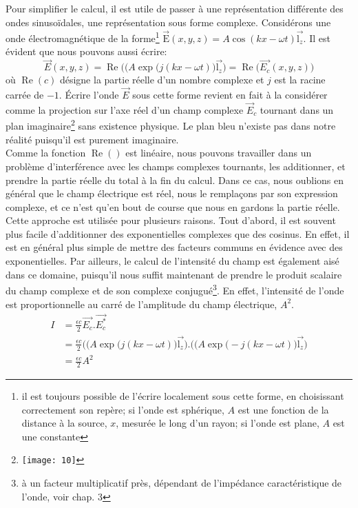Pour simplifier le calcul, il est utile de passer à une représentation différente des ondes sinusoïdales, une représentation sous forme complexe. Considérons une onde électromagnétique de la forme\footnote{il est toujours possible de l'écrire localement sous cette forme, en choisissant correctement son repère; si l'onde est sphérique, $A$ est une fonction de la distance à la source, $x$, mesurée le long d'un rayon; si l'onde est plane, $A$ est une constante} $\overset\rightarrow{\mbox{E}}(x,y,z)=A\cos(kx-\omega t)\overset\rightarrow{\mbox{l}_z}$. Il est évident que nous pouvons aussi écrire:
$$\overset\rightarrow{E}(x,y,z)=\operatorname{Re}\Big((A\exp\big(j(kx-\omega t)\big)\overset\rightarrow{\mbox{l}_z}\Big)=\operatorname{Re}\Big(\overset\rightarrow{E_c}(x,y,z)\Big)$$
où $\operatorname{Re}(c)$ désigne la partie réelle d'un nombre complexe et $j$ est la racine carrée de $-1$. Écrire l'onde $\overset\rightarrow{E}$ sous cette forme revient en fait à la considérer comme la projection sur l'axe réel d'un champ complexe $\overset\rightarrow{E}_c$ tournant dans un plan imaginaire\footnote{\texttt{[image: 10]}} sans existence physique. Le plan bleu n'existe pas dans notre réalité puisqu'il est purement imaginaire.\\

Comme la fonction $\operatorname{Re}()$ est linéaire, nous pouvons travailler dans un problème d'interférence avec les champs complexes tournants, les additionner, et prendre la partie réelle du total à la fin du calcul. Dans ce cas, nous oublions en général que le champ électrique est réel, nous le remplaçons par son expression complexe, et ce n'est qu'en bout de course que nous en gardons la partie réelle.\\

Cette approche est utilisée pour plusieurs raisons. Tout d'abord, il est souvent plus facile d'additionner des exponentielles complexes que des cosinus. En effet, il est en général plus simple de mettre des facteurs communs en évidence avec des exponentielles. Par ailleurs, le calcul de l'intensité du champ est également aisé dans ce domaine, puisqu'il nous suffit maintenant de prendre le produit scalaire du champ complexe et de son complexe conjugué\footnote{à un facteur multiplicatif près, dépendant de l'impédance caractéristique de l'onde, voir chap. 3}.
En effet, l'intensité de l'onde est proportionnelle au carré de l'amplitude du champ électrique, $A^2$.
\begin{align*}
I & = \frac{\epsilon c}{2}\overset\rightarrow{E_c}.\overset\rightarrow{E_c^*} \\
& = \frac{\epsilon c}{2}\Big((A\exp\big(j(kx-\omega t)\big)\overset\rightarrow{\mbox{l}_z}\Big).\Big((A\exp\big(-j(kx-\omega t)\big)\overset\rightarrow{\mbox{l}_z}\Big) \\
& = \frac{\epsilon c}{2}A^2
\end{align*}

